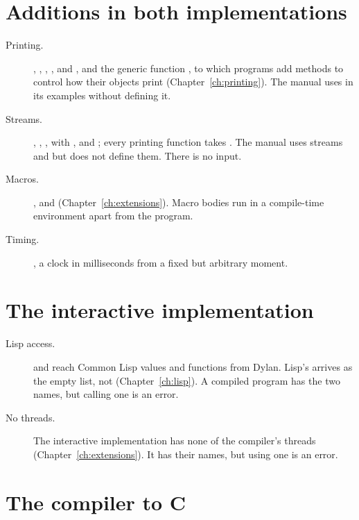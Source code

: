 \section{Additions in both implementations}\label{sec:diff-additions}

\begin{description}
\item[Printing.] , , ,
  ,  and , and the generic
  function , to which programs add methods to control
  how their objects print (Chapter~\ref{ch:printing}). The manual uses
   in its examples without defining it.
\item[Streams.] , ,
  ,  with
  , and ; every printing function
  takes . The manual uses streams and  but
  does not define them. There is no input.
\item[Macros.] ,  and
   (Chapter~\ref{ch:extensions}). Macro bodies run in a
  compile-time environment apart from the program.
\item[Timing.] , a clock in milliseconds
  from a fixed but arbitrary moment.
\end{description}

\section{The interactive implementation}\label{sec:diff-interactive}

\begin{description}
\item[Lisp access.]  and 
  reach Common Lisp values and functions from Dylan. Lisp's 
  arrives as the empty list, not 
  (Chapter~\ref{ch:lisp}). A compiled program has the two names, but
  calling one is an error.
\item[No threads.] The interactive implementation has none of the
  compiler's threads (Chapter~\ref{ch:extensions}). It has their names,
  but using one is an error.
\end{description}

\section{The compiler to C}\label{sec:diff-compiler}

